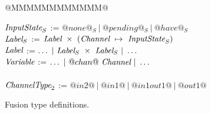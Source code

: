 
\begin{figure}

\begin{tabbing}
@MMMMMMMMMMMM@   \TABDEF \kill

$\textit{InputState}_S$ \> := \> $@none@_S ~|~ @pending@_S ~|~ @have@_S$
\\
$\textit{Label}_S$ \> := \> $\textit{Label}~\times~(\textit{Channel} ~\mapsto~ \textit{InputState}_S)$ \\
$\textit{Label}$   \> := \> $\ldots ~|~\textit{Label}_S~\times~\textit{Label}_S ~|~ \ldots$ \\
$\textit{Variable}$     \> := \> $\ldots ~|~@chan@~\textit{Channel} ~|~ \ldots$ \\
\\

$\textit{ChannelType}_2$   \> := \> $@in2@~|~@in1@~|~@in1out1@~|~@out1@$
\end{tabbing}

\caption{Fusion type definitions.}
\label{fig:Fusion:Types}
\end{figure}


